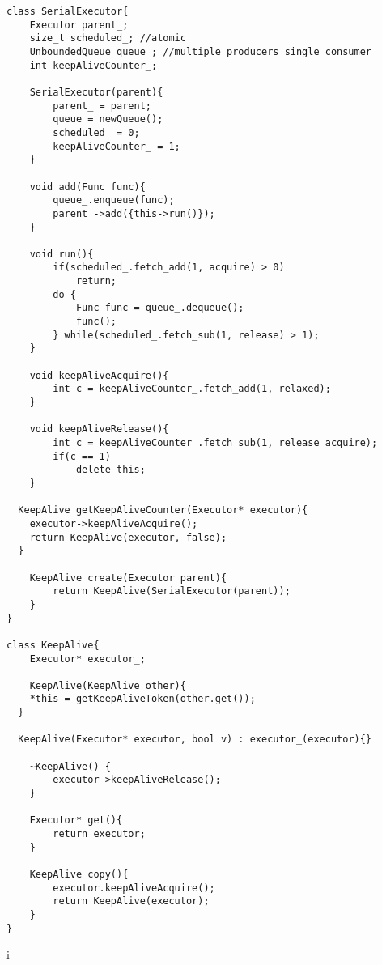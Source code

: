 \begin{lstlisting}
class SerialExecutor{
	Executor parent_;
	size_t scheduled_; //atomic
	UnboundedQueue queue_; //multiple producers single consumer
	int keepAliveCounter_;

	SerialExecutor(parent){
		parent_ = parent;
		queue = newQueue();
		scheduled_ = 0;
		keepAliveCounter_ = 1;
	}

	void add(Func func){
		queue_.enqueue(func);
		parent_->add({this->run()});
	}

	void run(){
		if(scheduled_.fetch_add(1, acquire) > 0)
			return;
		do {
			Func func = queue_.dequeue();
			func();
		} while(scheduled_.fetch_sub(1, release) > 1);
	}

	void keepAliveAcquire(){
		int c = keepAliveCounter_.fetch_add(1, relaxed);
	}

	void keepAliveRelease(){
		int c = keepAliveCounter_.fetch_sub(1, release_acquire);
		if(c == 1)
			delete this;
	}

  KeepAlive getKeepAliveCounter(Executor* executor){
    executor->keepAliveAcquire();
    return KeepAlive(executor, false);
  }

	KeepAlive create(Executor parent){
		return KeepAlive(SerialExecutor(parent));
	}
}

class KeepAlive{
	Executor* executor_;

	KeepAlive(KeepAlive other){
    *this = getKeepAliveToken(other.get());
  }

  KeepAlive(Executor* executor, bool v) : executor_(executor){}

	~KeepAlive() {
		executor->keepAliveRelease();
	}

	Executor* get(){
		return executor;
	}

	KeepAlive copy(){
		executor.keepAliveAcquire();
		return KeepAlive(executor);
	}
}
\end{lstlisting}
i%
